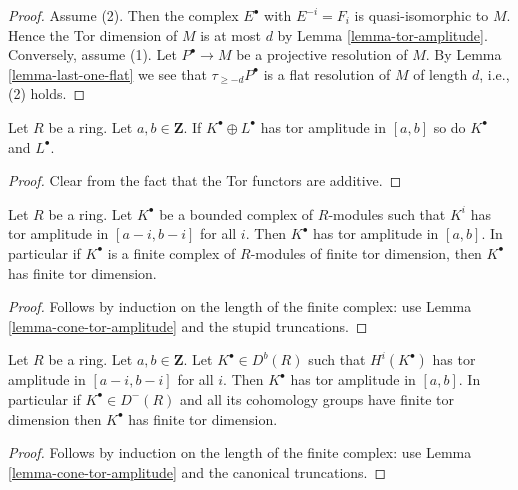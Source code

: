 \begin{proof}
Assume (2). Then the complex $E^\bullet$ with $E^{-i} = F_i$
is quasi-isomorphic to $M$. Hence the Tor dimension of $M$ is
at most $d$ by
Lemma \ref{lemma-tor-amplitude}.
Conversely, assume (1). Let $P^\bullet \to M$ be a projective
resolution of $M$. By
Lemma \ref{lemma-last-one-flat}
we see that $\tau_{\geq -d}P^\bullet$ is a flat resolution of
$M$ of length $d$, i.e., (2) holds.
\end{proof}

\begin{lemma}
\label{lemma-summands-tor-amplitude}
Let $R$ be a ring. Let $a, b \in \mathbf{Z}$.
If $K^\bullet \oplus L^\bullet$ has tor amplitude in $[a, b]$
so do $K^\bullet$ and $L^\bullet$.
\end{lemma}

\begin{proof}
Clear from the fact that the Tor functors are additive.
\end{proof}

\begin{lemma}
\label{lemma-complex-finite-tor-dimension-modules}
Let $R$ be a ring. Let $K^\bullet$ be a bounded complex of $R$-modules
such that $K^i$ has tor amplitude in $[a - i, b - i]$ for all $i$.
Then $K^\bullet$ has tor amplitude in $[a, b]$. In particular
if $K^\bullet$ is a finite complex of $R$-modules of finite tor dimension,
then $K^\bullet$ has finite tor dimension.
\end{lemma}

\begin{proof}
Follows by induction on the length of the finite complex: use
Lemma \ref{lemma-cone-tor-amplitude}
and the stupid truncations.
\end{proof}

\begin{lemma}
\label{lemma-cohomology-tor-amplitude}
Let $R$ be a ring. Let $a, b \in \mathbf{Z}$. Let $K^\bullet \in D^b(R)$
such that $H^i(K^\bullet)$ has tor amplitude in $[a - i, b - i]$
for all $i$. Then $K^\bullet$ has tor amplitude in $[a, b]$. In particular
if $K^\bullet \in D^{-}(R)$ and all its cohomology groups have finite tor
dimension then $K^\bullet$ has finite tor dimension.
\end{lemma}

\begin{proof}
Follows by induction on the length of the finite complex: use
Lemma \ref{lemma-cone-tor-amplitude}
and the canonical truncations.
\end{proof}

